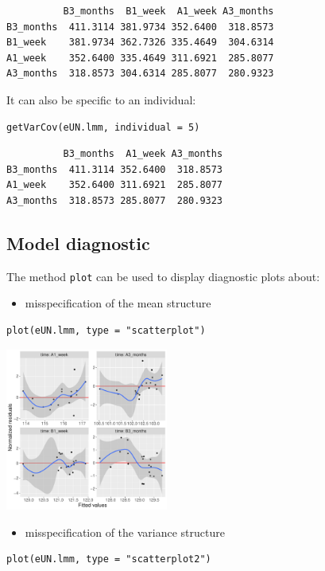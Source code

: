 \documentclass[12pt]{article}
\begin{document}
\begin{verbatim}
          B3_months  B1_week  A1_week A3_months
B3_months  411.3114 381.9734 352.6400  318.8573
B1_week    381.9734 362.7326 335.4649  304.6314
A1_week    352.6400 335.4649 311.6921  285.8077
A3_months  318.8573 304.6314 285.8077  280.9323
\end{verbatim}


It can also be specific to an individual:
\lstset{language=r,label= ,caption= ,captionpos=b,numbers=none}
\begin{lstlisting}
getVarCov(eUN.lmm, individual = 5)
\end{lstlisting}

\begin{verbatim}
          B3_months  A1_week A3_months
B3_months  411.3114 352.6400  318.8573
A1_week    352.6400 311.6921  285.8077
A3_months  318.8573 285.8077  280.9323
\end{verbatim}


\clearpage

\subsection{Model diagnostic}
\label{sec:org9b58eb1}

The method \texttt{plot} can be used to display diagnostic plots about:
\begin{itemize}
\item misspecification of the mean structure
\end{itemize}
\lstset{language=r,label= ,caption= ,captionpos=b,numbers=none}
\begin{lstlisting}
plot(eUN.lmm, type = "scatterplot")
\end{lstlisting}

\begin{center}
\includegraphics[width=0.4\textwidth]{./figures/diag-scatterplot.pdf}
\end{center}

\begin{itemize}
\item misspecification of the variance structure
\end{itemize}
\lstset{language=r,label= ,caption= ,captionpos=b,numbers=none}
\begin{lstlisting}
plot(eUN.lmm, type = "scatterplot2")
\end{lstlisting}
\end{document}
